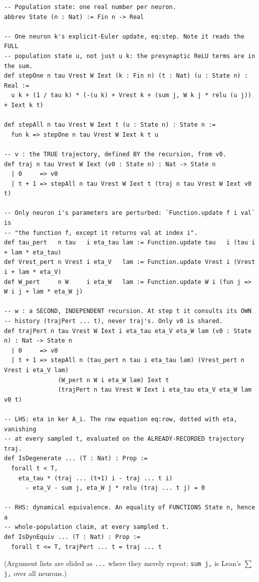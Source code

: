 \documentclass[11pt]{article}
\begin{document}
\begin{verbatim}
-- Population state: one real number per neuron.
abbrev State (n : Nat) := Fin n -> Real

-- One neuron k's explicit-Euler update, eq:step. Note it reads the FULL
-- population state u, not just u k: the presynaptic ReLU terms are in the sum.
def stepOne n tau Vrest W Iext (k : Fin n) (t : Nat) (u : State n) : Real :=
  u k + (1 / tau k) * (-(u k) + Vrest k + (sum j, W k j * relu (u j)) + Iext k t)

def stepAll n tau Vrest W Iext t (u : State n) : State n :=
  fun k => stepOne n tau Vrest W Iext k t u

-- v : the TRUE trajectory, defined BY the recursion, from v0.
def traj n tau Vrest W Iext (v0 : State n) : Nat -> State n
  | 0     => v0
  | t + 1 => stepAll n tau Vrest W Iext t (traj n tau Vrest W Iext v0 t)

-- Only neuron i's parameters are perturbed: `Function.update f i val` is
-- "the function f, except it returns val at index i".
def tau_pert   n tau   i eta_tau lam := Function.update tau   i (tau i + lam * eta_tau)
def Vrest_pert n Vrest i eta_V   lam := Function.update Vrest i (Vrest i + lam * eta_V)
def W_pert     n W     i eta_W   lam := Function.update W i (fun j => W i j + lam * eta_W j)

-- w : a SECOND, INDEPENDENT recursion. At step t it consults its OWN
-- history (trajPert ... t), never traj's. Only v0 is shared.
def trajPert n tau Vrest W Iext i eta_tau eta_V eta_W lam (v0 : State n) : Nat -> State n
  | 0     => v0
  | t + 1 => stepAll n (tau_pert n tau i eta_tau lam) (Vrest_pert n Vrest i eta_V lam)
               (W_pert n W i eta_W lam) Iext t
               (trajPert n tau Vrest W Iext i eta_tau eta_V eta_W lam v0 t)

-- LHS: eta in ker A_i. The row equation eq:row, dotted with eta, vanishing
-- at every sampled t, evaluated on the ALREADY-RECORDED trajectory traj.
def IsDegenerate ... (T : Nat) : Prop :=
  forall t < T,
    eta_tau * (traj ... (t+1) i - traj ... t i)
      - eta_V - sum j, eta_W j * relu (traj ... t j) = 0

-- RHS: dynamical equivalence. An equality of FUNCTIONS State n, hence a
-- whole-population claim, at every sampled t.
def IsDynEquiv ... (T : Nat) : Prop :=
  forall t <= T, trajPert ... t = traj ... t
\end{verbatim}
(Argument lists are elided as \texttt{...} where they merely repeat;
\texttt{sum j,} is Lean's \texttt{$\sum$ j,} over all neurons.)
\end{document}
